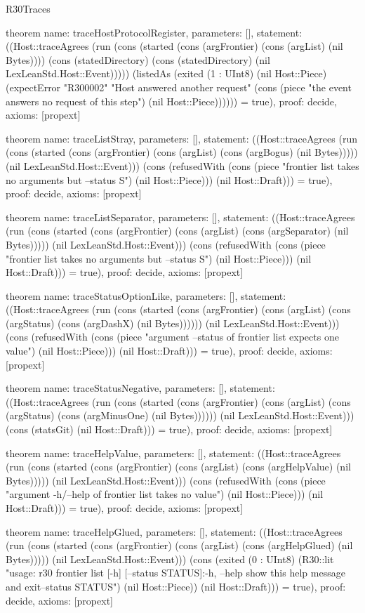 \begin{lexlean}{R30Traces}
\begin{semanticmodule}
theorem{
  name: traceHostProtocolRegister,
  parameters: [],
  statement: ((Host::traceAgrees (run (cons (started (cons (argFrontier) (cons (argList) (nil Bytes)))) (cons (statedDirectory) (cons (statedDirectory) (nil LexLeanStd.Host::Event))))) (listedAs (exited (1 : UInt8) (nil Host::Piece) (expectError "R300002" "Host answered another request" (cons (piece "the event answers no request of this step") (nil Host::Piece)))))) = true),
  proof: decide{},
  axioms: [propext]
}

theorem{
  name: traceListStray,
  parameters: [],
  statement: ((Host::traceAgrees (run (cons (started (cons (argFrontier) (cons (argList) (cons (argBogus) (nil Bytes))))) (nil LexLeanStd.Host::Event))) (cons (refusedWith (cons (piece "frontier list takes no arguments but --status S") (nil Host::Piece))) (nil Host::Draft))) = true),
  proof: decide{},
  axioms: [propext]
}

theorem{
  name: traceListSeparator,
  parameters: [],
  statement: ((Host::traceAgrees (run (cons (started (cons (argFrontier) (cons (argList) (cons (argSeparator) (nil Bytes))))) (nil LexLeanStd.Host::Event))) (cons (refusedWith (cons (piece "frontier list takes no arguments but --status S") (nil Host::Piece))) (nil Host::Draft))) = true),
  proof: decide{},
  axioms: [propext]
}

theorem{
  name: traceStatusOptionLike,
  parameters: [],
  statement: ((Host::traceAgrees (run (cons (started (cons (argFrontier) (cons (argList) (cons (argStatus) (cons (argDashX) (nil Bytes)))))) (nil LexLeanStd.Host::Event))) (cons (refusedWith (cons (piece "argument --status of frontier list expects one value") (nil Host::Piece))) (nil Host::Draft))) = true),
  proof: decide{},
  axioms: [propext]
}

theorem{
  name: traceStatusNegative,
  parameters: [],
  statement: ((Host::traceAgrees (run (cons (started (cons (argFrontier) (cons (argList) (cons (argStatus) (cons (argMinusOne) (nil Bytes)))))) (nil LexLeanStd.Host::Event))) (cons (statsGit) (nil Host::Draft))) = true),
  proof: decide{},
  axioms: [propext]
}

theorem{
  name: traceHelpValue,
  parameters: [],
  statement: ((Host::traceAgrees (run (cons (started (cons (argFrontier) (cons (argList) (cons (argHelpValue) (nil Bytes))))) (nil LexLeanStd.Host::Event))) (cons (refusedWith (cons (piece "argument -h/--help of frontier list takes no value") (nil Host::Piece))) (nil Host::Draft))) = true),
  proof: decide{},
  axioms: [propext]
}

theorem{
  name: traceHelpGlued,
  parameters: [],
  statement: ((Host::traceAgrees (run (cons (started (cons (argFrontier) (cons (argList) (cons (argHelpGlued) (nil Bytes))))) (nil LexLeanStd.Host::Event))) (cons (exited (0 : UInt8) (R30::lit "usage: r30 frontier list [-h] [--status STATUS]\n\noptions:\n  -h, --help       show this help message and exit\n  --status STATUS\n") (nil Host::Piece)) (nil Host::Draft))) = true),
  proof: decide{},
  axioms: [propext]
}


\end{semanticmodule}
\end{lexlean}
